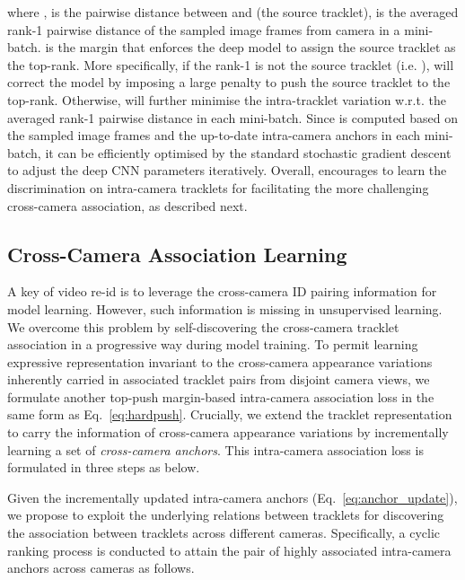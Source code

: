 \documentclass{bmvc2k}
\begin{document}
where ,
 is the pairwise distance between  and  (the source tracklet), 
 is the averaged rank-1 pairwise distance of the  sampled image frames from camera 
in a mini-batch. 
 is the margin that enforces the deep model to assign the source tracklet as the top-rank. 
More specifically, if the rank-1 is not the source tracklet (i.e. ), 
 will correct the model by imposing a large penalty
to push the source tracklet to the top-rank.  
Otherwise,  will further minimise the intra-tracklet variation w.r.t. the averaged rank-1 pairwise distance in each mini-batch. 
Since  is computed based on 
the sampled image frames and the up-to-date {intra-camera anchors} in each mini-batch, 
it can be efficiently optimised by the standard stochastic gradient descent to adjust the deep CNN parameters iteratively. Overall,  encourages to learn the discrimination on intra-camera tracklets for facilitating the 
more challenging cross-camera association, as described next.
 
\vspace{-0.2cm}
\subsection{Cross-Camera Association Learning}
\label{cross-cam}
A key of video re-id is to leverage the 
cross-camera ID pairing information for model learning.
However, such information is missing in unsupervised learning. 
We overcome this problem by self-discovering the cross-camera tracklet association in a progressive way 
during model training. 
To permit learning expressive representation invariant to 
the cross-camera appearance variations inherently carried in 
associated tracklet pairs from disjoint camera views, 
we formulate another top-push margin-based intra-camera association loss 
in the same form as Eq.~\eqref{eq:hardpush}. 
Crucially, we extend the tracklet
representation to carry the information of cross-camera appearance variations 
by incrementally learning a set of {\em cross-camera anchors}. 
This intra-camera association loss is formulated in three steps as below.

\vspace{0.1em}
Given the incrementally updated {intra-camera anchors} (Eq.~\eqref{eq:anchor_update}), 
we propose to exploit the underlying relations between tracklets for  
discovering the association between tracklets across different cameras.
Specifically, a cyclic ranking process is conducted to attain the pair of highly associated {intra-camera anchors} across cameras as follows.  
\end{document}
